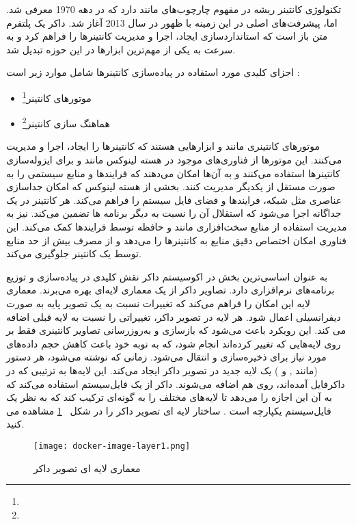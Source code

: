تکنولوژی کانتینر ریشه در مفهوم چارچوب‌های  مانند  دارد که در دهه 1970 معرفی شد. اما، پیشرفت‌های اصلی در این زمینه با ظهور  در سال 2013 آغاز شد. داکر یک پلتفرم متن باز است که استاندارد‌سازی ایجاد، اجرا و مدیریت کانتینرها را فراهم کرد و به سرعت به یکی از مهم‌ترین ابزارها در این حوزه تبدیل شد.

اجزای کلیدی مورد استفاده در پیاده‌سازی کانتینرها شامل موارد زیر است \cite{Docker2}:
\begin{itemize}
	\item 
	موتورهای کانتینر\footnote{}
	\item
	هماهنگ سازی کانتینر\footnote{}
\end{itemize}


موتورهای کانتینری مانند  و  ابزارهایی هستند که کانتینرها را ایجاد، اجرا و مدیریت می‌کنند. این موتورها از فناوری‌های موجود در هسته لینوکس مانند  و  برای ایزوله‌سازی کانتینرها استفاده می‌کنند و به آن‌ها امکان می‌دهند که فرایندها و منابع سیستمی را به صورت مستقل از یکدیگر مدیریت کنند.  بخشی از هسته لینوکس که امکان جداسازی عناصری مثل شبکه، فرایندها و فضای فایل سیستم را فراهم می‌کند. هر کانتینر در یک  جداگانه اجرا می‌شود که استقلال آن را نسبت به دیگر برنامه ها تضمین می‌کند.  نیز به مدیریت استفاده از منابع سخت‌افزاری مانند  و حافظه توسط فرایندها کمک می‌کند. این فناوری امکان اختصاص دقیق منابع به کانتینرها را می‌دهد و از مصرف بیش از حد منابع توسط یک کانتینر جلوگیری می‌کند.

 به عنوان اساسی‌ترین بخش در اکوسیستم داکر نقش کلیدی در پیاده‌سازی و توزیع برنامه‌های نرم‌افزاری دارد. تصاویر داکر از یک معماری لایه‌ای بهره می‌برند. معماری لایه این امکان را فراهم می‌کند که تغییرات نسبت به یک تصویر پایه به صورت دیفرانسیلی اعمال شود. هر لایه در تصویر داکر، تغییراتی را نسبت به لایه قبلی اضافه می کند. این رویکرد باعث می‌شود که بازسازی و به‌روزرسانی تصاویر کانتینری فقط بر روی لایه‌هایی که تغییر کرده‌اند انجام شود، که به نوبه خود باعث کاهش حجم داده‌های مورد نیاز برای ذخیره‌سازی و انتقال می‌شود. زمانی که  نوشته می‌شود، هر دستور (مانند ,  و ) یک لایه جدید در تصویر داکر ایجاد می‌کند. این لایه‌ها به ترتیبی که در داکرفایل آمده‌اند، روی هم اضافه می‌شوند. داکر از یک فایل‌سیستم  استفاده می‌کند که به آن این اجازه را می‌دهد تا لایه‌های مختلف را به گونه‌ای ترکیب کند که به نظر یک فایل‌سیستم یکپارچه است \cite{Docker1}. ساختار لایه ای تصویر داکر را در شکل 
~\ref{fig: docker image layer}
 مشاهده می کنید.
\begin{figure}[t]
	\centering
	\texttt{[image: docker-image-layer1.png]}
	\caption{معماری لایه ای تصویر داکر}
	\label{fig: docker image layer}
\end{figure}

